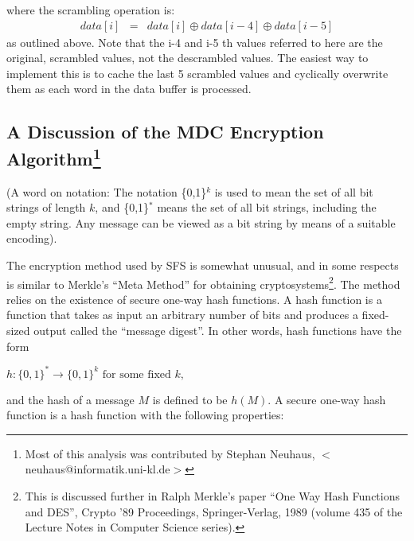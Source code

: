 where the scrambling operation is:
\begin{eqnarray*}
       data[ i ] & = & data[ i ] \oplus data[ i-4 ] \oplus data[ i-5 ]
\end{eqnarray*}
as outlined above.  Note that the i-4 and i-5 th values referred to here are
the original, scrambled values, not the descrambled values.  The easiest way to
implement this is to cache the last 5 scrambled values and cyclically overwrite
them as each word in the data buffer is processed.



\subsection{A Discussion of the MDC Encryption Algorithm\protect\footnote{
              Most of this analysis was contributed by Stephan Neuhaus,
              $<$neuhaus@informatik.uni-kl.de$>$
}}

(A word on notation:  The notation \{0,1\}$^k$ is used to mean the set of all bit
strings of length $k$, and \{0,1\}$^*$ means the set of all bit strings, including the
empty string.  Any message can be viewed as a bit string by means of a suitable
encoding).

The encryption method used by SFS is somewhat unusual, and in some respects is
similar to Merkle's ``Meta Method'' for obtaining cryptosystems\footnote{
		This is discussed further in Ralph Merkle's paper ``One Way Hash
              	Functions and DES'', Crypto '89 Proceedings, Springer-Verlag,
              	1989 (volume 435 of the Lecture Notes in Computer Science
              	series).
}.  The method
relies on the existence of secure one-way hash functions.  A hash function is a
function that takes as input an arbitrary number of bits and produces a
fixed-sized output called the ``message digest''.  In other words, hash functions
have the form

    $h : \{0,1\}^* \rightarrow \{0,1\}^k              \mbox{ for some fixed $k$,}$

and the hash of a message $M$ is defined to be $h( M )$.  A secure one-way hash
function is a hash function with the following properties:


